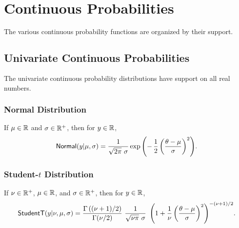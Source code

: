 \begin{description}
\end{description}


\chapter{Continuous Probabilities}\label{continuous-prob-functions.chapter}

\noindent
The various continuous probability functions are organized by their
support.

\section{Univariate Continuous Probabilities}

The univariate continuous probability distributions have support on all
real numbers.

\subsection{Normal Distribution}

If $\mu \in \mathbb{R}$ and $\sigma \in \mathbb{R}^+$, then for $y \in
\mathbb{R}$,
\[
\mbox{\sf Normal}(y|\mu,\sigma)
=
\frac{1}{\sqrt{2 \pi} \ \sigma}
\exp\left( - \, \frac{1}{2}
           \left(  \frac{\theta - \mu}{\sigma} \right)^2
    \right)
\!.
\]

\begin{description}
%
\end{description}


\subsection{Student-$t$ Distribution}

If $\nu \in \mathbb{R}^+$, $\mu \in \mathbb{R}$, and $\sigma \in \mathbb{R}^+$,
then for $y \in \mathbb{R}$,
\[
\mbox{\sf StudentT}(y|\nu,\mu,\sigma)
=
\frac{\Gamma\left((\nu + 1)/2\right)}
     {\Gamma(\nu/2)}
\
\frac{1}{\sqrt{\nu \pi} \ \sigma}
\
\left(
1 + \frac{1}{\nu} \left(\frac{\theta - \mu}{\sigma}\right)^2
\right)^{-(\nu + 1)/2}
\! .
\]

